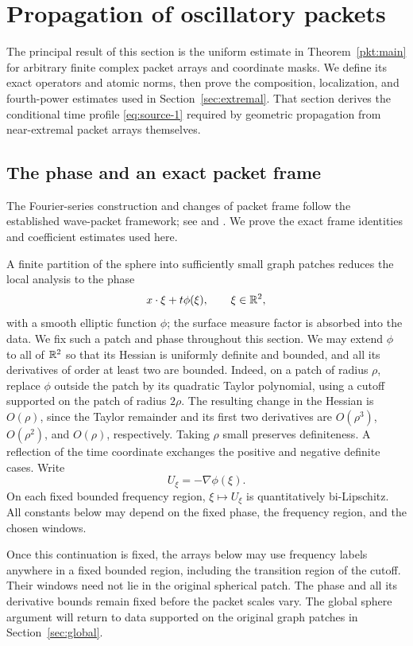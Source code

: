 \section{Propagation of oscillatory packets}\label{sec:packets}

The principal result of this section is the uniform estimate in
Theorem~\ref{pkt:main} for arbitrary finite complex packet arrays and
coordinate masks.  We define its exact operators and atomic norms,
then prove the composition, localization, and fourth-power estimates
used in Section~\ref{sec:extremal}.  That section derives the conditional
time profile \eqref{eq:source-1} required by geometric propagation from
near-extremal packet arrays themselves.

\subsection{The phase and an exact packet frame}

The Fourier-series construction and changes of packet frame follow the
established wave-packet framework; see
\cite[arXiv:math/0210084v2, Section~4 and Lemma~4.1]{Tao2003} and
\cite[arXiv:2104.11188v1, Section~4.1]{GOWWZ2025Packets}.
We prove the exact frame identities and coefficient estimates used here.

A finite partition of the sphere into sufficiently small graph patches
reduces the local analysis to the phase
\[
 x\cdot\xi+t\phi(\xi),\qquad \xi\in\mathbb R^2,
\]
with a smooth elliptic function $\phi$; the surface measure factor is
absorbed into the data.  We fix such a patch and phase throughout this
section.  We may extend $\phi$ to all of $\mathbb R^2$ so that its Hessian is
uniformly definite and bounded, and all its derivatives of order at
least two are bounded.  Indeed, on a patch of radius $\rho$, replace
$\phi$ outside the patch by its quadratic Taylor polynomial, using a
cutoff supported on the patch of radius $2\rho$.  The resulting change
in the Hessian is $O(\rho)$, since the Taylor remainder and its first two
derivatives are $O(\rho^3)$, $O(\rho^2)$, and $O(\rho)$, respectively.
Taking $\rho$ small preserves definiteness.  A reflection of the time
coordinate exchanges the positive and negative definite cases.  Write
\[
 U_\xi=-\nabla\phi(\xi).
\]
On each fixed bounded frequency region, $\xi\mapsto U_\xi$ is
quantitatively bi-Lipschitz.  All constants below may depend on the
fixed phase, the frequency region, and the chosen windows.

Once this continuation is fixed, the arrays below may use frequency
labels anywhere in a fixed bounded region, including the transition
region of the cutoff.  Their windows need not lie in the original
spherical patch.  The phase and all its derivative bounds remain fixed
before the packet scales vary.  The global sphere argument will return
to data supported on the original graph patches in
Section~\ref{sec:global}.


